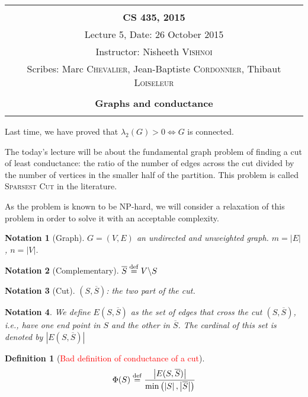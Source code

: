 \documentclass[12pt]{article}
\newtheorem{definition}[lemma]{Definition}
\newtheorem{notation}{Notation}
\newcommand{\defeq}{\stackrel{{\rm def}}{=}}
\newcommand{\LRa}{\Leftrightarrow}
\newcommand{\card}[1]{\left\lvert#1\right\rvert}
\newcommand{\NP}{\textsc{NP}}
\begin{document}
\begin{center}
\begin{tabular}{|c|}
\hline
\\
{\bf CS 435, 2015} \\
 Lecture 5, Date: 26 October 2015\\
Instructor: Nisheeth \textsc{Vishnoi} \\
Scribes: Marc \textsc{Chevalier}, Jean-Baptiste \textsc{Cordonnier}, Thibaut \textsc{Loiseleur} \\ \\
{\bfseries \large Graphs and conductance} \\ \\ \hline
\end{tabular}
\end{center}


Last time, we have proved that $\lambda_2(G) > 0 \LRa G$ is connected.

The today's lecture will be about the fundamental graph problem of finding a cut of least conductance: the ratio of the number of edges across the cut divided by the number of vertices in the smaller half of the partition. This problem is called \textsc{Sparsest Cut} in the literature.

As the problem is known to be \NP-hard, we will consider a relaxation of this problem in order to solve it with an acceptable complexity.


\begin{notation}[Graph]
    $G = (V,E)$ an undirected and unweighted graph. $m=\lvert E\rvert$, $n=\lvert V\rvert$.
\end{notation}

\begin{notation}[Complementary]
    $\overline{S}\defeq V\backslash S$
\end{notation}

\begin{notation}[Cut]
    $(S,\overline{S})$: the two part of the cut.
\end{notation}
    
\begin{notation}
    We define $E(S,\overline{S})$ as the set of edges that cross the cut  $(S,\overline{S})$, i.e., have one end point in $S$ and the other in $\overline{S}$. The cardinal of this set is denoted by $\card{E(S,\overline{S})}$
\end{notation}    
    
\begin{definition}[\textcolor{red}{Bad definition of conductance of a cut}]
    \textcolor{red}{\[
        \Phi(S) \defeq \frac{\card{E(S,\overline{S})}}{\min\left(\card{S},\card{\overline{S}}\right)}
    \]}
\end{definition}
\end{document}
